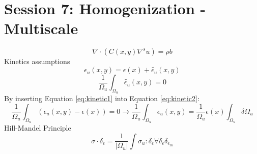 

\section{Session 7: Homogenization - Multiscale}

\begin{equation}\label{key}
\nabla\cdot(C(x,y)\nabla^s u)=\rho b
\end{equation}
Kinetics assumptions
\begin{equation}\label{eq:kinetic1}
\epsilon_u(x,y)=\epsilon(x)+\tilde{\epsilon_u}(x,y)
\end{equation}
\begin{equation}\label{eq:kinetic2}
\frac{1}{\Omega_u}\int_{\Omega_u}^{}\tilde{\epsilon_u}(x,y)=0
\end{equation}
By inserting Equation \ref{eq:kinetic1} into Equation \ref{eq:kinetic2}:
\begin{equation}\label{key}
\frac{1}{\Omega_u}\int_{\Omega_u}^{}\left(\epsilon_u(x,y)-\epsilon(x)\right)=0 \rightarrow \frac{1}{\Omega_u}\int_{\Omega_u}^{}\epsilon_u(x,y)=\frac{1}{\Omega_u}\epsilon(x)\int_{\Omega_u}^{}\delta\Omega_u 
\end{equation}
Hill-Mandel Principle
\begin{equation}\label{key}
\sigma\cdot\delta_{\epsilon}=\frac{1}{|\Omega_u|}\int\sigma_u\colon\delta_{\epsilon} \forall\delta_{\epsilon}\delta_{\epsilon_m}
\end{equation}


\clearpage























